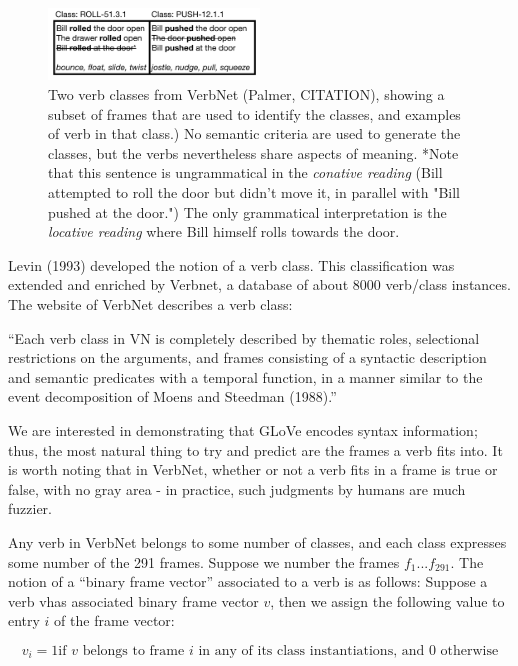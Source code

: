 \documentclass[a4paper]{article}
\begin{document}
\begin{figure}[H]
\centering
\includegraphics[width=0.5\textwidth]{VerbTable.png}
\caption{\label{fig:frog} Two verb classes from VerbNet (Palmer, CITATION), showing a subset of frames that are used to identify the classes, and examples of verb in that class.) No semantic criteria are used to generate the classes, but the verbs nevertheless share aspects of meaning.  *Note that this sentence is ungrammatical in the \emph{conative reading} (Bill attempted to roll the door but didn't move it, in parallel with "Bill pushed at the door.") The only grammatical interpretation is the \emph{locative reading} where Bill himself rolls towards the door. }
\end{figure}


Levin (1993) developed the notion of a verb class. This classification was extended and enriched by Verbnet, a database of about 8000 verb/class instances. The website of VerbNet describes a verb class:

\begin{displayquote}
“Each verb class in VN is completely described by thematic roles, selectional restrictions on the arguments, and frames consisting of a syntactic description and semantic predicates with a temporal function, in a manner similar to the event decomposition of Moens and Steedman (1988).”
\end{displayquote}

We are interested in demonstrating that GLoVe encodes syntax information; thus, the most natural thing to try and predict are the frames a verb fits into. It is worth noting that in VerbNet, whether or not a verb fits in a frame is true or false, with no gray area - in practice, such judgments by humans are much fuzzier. 


Any verb in VerbNet belongs to some number of classes, and each class expresses some number of the 291 frames. Suppose we number the frames $f_1... f_{291}$. The notion of a “binary frame vector” associated to a verb is as follows: Suppose a verb vhas associated binary frame vector $v$, then we assign the following value to entry $i$ of the frame vector:

	\[ v_i =1  \text{if $v$ belongs to frame $i$ in any of its class instantiations, and 0 otherwise} \]
\end{document}
